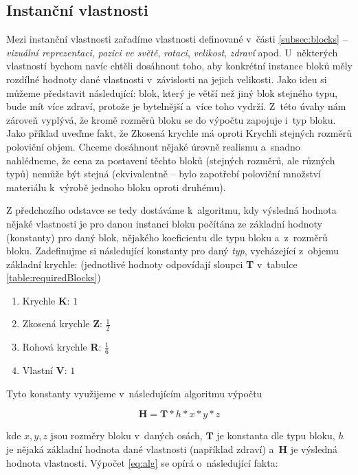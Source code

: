 \subsection{Instanční vlastnosti}
\label{subsec:instVlast}
Mezi instanční vlastnosti zařadíme vlastnosti definované v~části \ref{subsec:blocks} --  \textit{vizuální reprezentaci}, \textit{pozici ve světě}, \textit{rotaci}, \textit{velikost}, \textit{zdraví} apod. U~některých vlastností bychom navíc chtěli dosáhnout toho, aby konkrétní instance bloků měly rozdílné hodnoty dané vlastnosti v~závislosti na jejich velikosti. Jako ideu si můžeme představit následující: blok, který je větší než jiný blok stejného typu, bude mít více zdraví, protože je bytelnější a~více toho vydrží. Z~této úvahy nám zároveň vyplývá, že kromě rozměrů bloku se do výpočtu zapojuje i~typ bloku. Jako příklad uveďme fakt, že Zkosená krychle má oproti Krychli stejných rozměrů poloviční objem. Chceme dosáhnout nějaké úrovně realismu a~snadno nahlédneme, že cena za postavení těchto bloků (stejných rozměrů, ale různých typů) nemůže být stejná (ekvivalentně -- bylo zapotřebí poloviční množství materiálu k~výrobě jednoho bloku oproti druhému).

Z předchozího odstavce se tedy dostáváme k~algoritmu, kdy výsledná hodnota nějaké vlastnosti je pro danou instanci bloku počítána ze základní hodnoty (konstanty) pro daný blok, nějakého koeficientu dle typu bloku a~z~rozměrů bloku. Zadefinujme si následující konstanty pro daný \textit{typ}, vycházející z~objemu základní krychle: (jednotlivé hodnoty odpovídají sloupci \textbf{T} v~tabulce \ref{table:requiredBlocks})

\begin{enumerate}
	\item Krychle \textbf{K}: $1$
	\item Zkosená krychle \textbf{Z}: $\frac{1}{2}$
	\item Rohová krychle \textbf{R}: $\frac{1}{6}$
	\item Vlastní \textbf{V}: $1$
\end{enumerate}

Tyto konstanty využijeme v~následujícím algoritmu výpočtu

\begin{equation}\label{eq:alg}
	\bm H = \bm T * h  * x * y * z
\end{equation}

kde $x, y, z$ jsou rozměry bloku v~daných osách, $\bm T$ je konstanta dle typu bloku, $h$ je nějaká základní hodnota dané vlastnosti (například zdraví) a~$\bm H$ je výsledná hodnota vlastnosti. Výpočet \ref{eq:alg} se opírá o~následující fakta:

